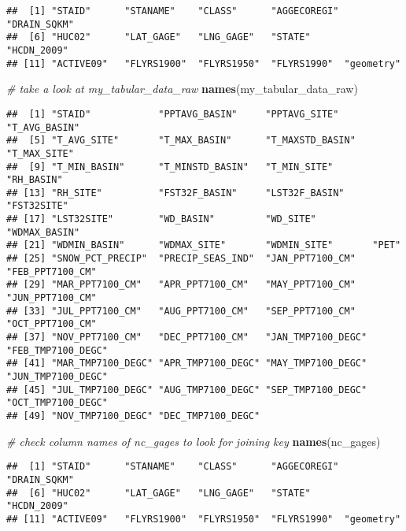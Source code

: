 \documentclass[]{article}
\newenvironment{Shaded}{\begin{snugshade}}{\end{snugshade}}
\newcommand{\KeywordTok}[1]{\textcolor[rgb]{0.13,0.29,0.53}{\textbf{#1}}}
\newcommand{\CommentTok}[1]{\textcolor[rgb]{0.56,0.35,0.01}{\textit{#1}}}
\newcommand{\NormalTok}[1]{#1}
\begin{document}
\begin{verbatim}
##  [1] "STAID"      "STANAME"    "CLASS"      "AGGECOREGI" "DRAIN_SQKM"
##  [6] "HUC02"      "LAT_GAGE"   "LNG_GAGE"   "STATE"      "HCDN_2009" 
## [11] "ACTIVE09"   "FLYRS1900"  "FLYRS1950"  "FLYRS1990"  "geometry"
\end{verbatim}

\begin{Shaded}
\begin{Highlighting}[]
\CommentTok{# take a look at my_tabular_data_raw}
\KeywordTok{names}\NormalTok{(my_tabular_data_raw)}
\end{Highlighting}
\end{Shaded}

\begin{verbatim}
##  [1] "STAID"            "PPTAVG_BASIN"     "PPTAVG_SITE"      "T_AVG_BASIN"     
##  [5] "T_AVG_SITE"       "T_MAX_BASIN"      "T_MAXSTD_BASIN"   "T_MAX_SITE"      
##  [9] "T_MIN_BASIN"      "T_MINSTD_BASIN"   "T_MIN_SITE"       "RH_BASIN"        
## [13] "RH_SITE"          "FST32F_BASIN"     "LST32F_BASIN"     "FST32SITE"       
## [17] "LST32SITE"        "WD_BASIN"         "WD_SITE"          "WDMAX_BASIN"     
## [21] "WDMIN_BASIN"      "WDMAX_SITE"       "WDMIN_SITE"       "PET"             
## [25] "SNOW_PCT_PRECIP"  "PRECIP_SEAS_IND"  "JAN_PPT7100_CM"   "FEB_PPT7100_CM"  
## [29] "MAR_PPT7100_CM"   "APR_PPT7100_CM"   "MAY_PPT7100_CM"   "JUN_PPT7100_CM"  
## [33] "JUL_PPT7100_CM"   "AUG_PPT7100_CM"   "SEP_PPT7100_CM"   "OCT_PPT7100_CM"  
## [37] "NOV_PPT7100_CM"   "DEC_PPT7100_CM"   "JAN_TMP7100_DEGC" "FEB_TMP7100_DEGC"
## [41] "MAR_TMP7100_DEGC" "APR_TMP7100_DEGC" "MAY_TMP7100_DEGC" "JUN_TMP7100_DEGC"
## [45] "JUL_TMP7100_DEGC" "AUG_TMP7100_DEGC" "SEP_TMP7100_DEGC" "OCT_TMP7100_DEGC"
## [49] "NOV_TMP7100_DEGC" "DEC_TMP7100_DEGC"
\end{verbatim}

\begin{Shaded}
\begin{Highlighting}[]
\CommentTok{# check column names of nc_gages to look for joining key}
\KeywordTok{names}\NormalTok{(nc_gages)}
\end{Highlighting}
\end{Shaded}

\begin{verbatim}
##  [1] "STAID"      "STANAME"    "CLASS"      "AGGECOREGI" "DRAIN_SQKM"
##  [6] "HUC02"      "LAT_GAGE"   "LNG_GAGE"   "STATE"      "HCDN_2009" 
## [11] "ACTIVE09"   "FLYRS1900"  "FLYRS1950"  "FLYRS1990"  "geometry"
\end{verbatim}
\end{document}
